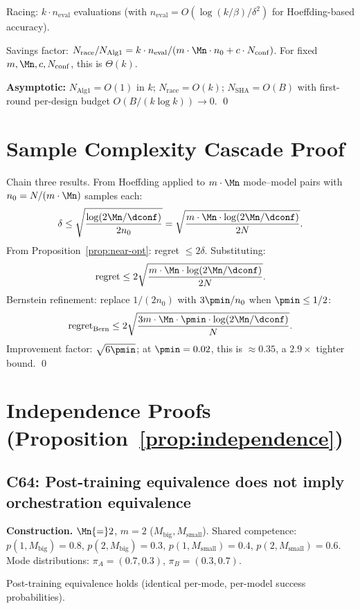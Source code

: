 Racing: $k \cdot n_{\mathrm{eval}}$ evaluations (with
$n_{\mathrm{eval}} = O(\log(k/\beta)/\delta^2)$ for Hoeffding-based
accuracy).

Savings factor:
$N_{\mathrm{race}}/N_{\mathrm{Alg1}} = k \cdot n_{\mathrm{eval}} /
(m \cdot \Mn \cdot n_0 + c \cdot N_{\mathrm{conf}})$.
For fixed $m, \Mn, c, N_{\mathrm{conf}}$, this is $\Theta(k)$.

\textbf{Asymptotic:}
$N_{\mathrm{Alg1}} = O(1)$ in $k$;
$N_{\mathrm{race}} = O(k)$;
$N_{\mathrm{SHA}} = O(B)$ with first-round per-design budget
$O(B/(k\log k)) \to 0$. \qed

\section{Sample Complexity Cascade Proof}
\label{app:cascade}

Chain three results.  From Hoeffding applied to $m \cdot \Mn$ mode--model
pairs with $n_0 = N/(m \cdot \Mn)$ samples each:
\[
  \delta \le \sqrt{\frac{\log(2\Mn/\dconf)}{2n_0}}
  = \sqrt{\frac{m \cdot \Mn \cdot \log(2\Mn/\dconf)}{2N}}.
\]
From Proposition~\ref{prop:near-opt}: regret $\le 2\delta$.
Substituting:
\[
  \text{regret} \le 2\sqrt{\frac{m \cdot \Mn \cdot \log(2\Mn/\dconf)}{2N}}.
\]
Bernstein refinement: replace $1/(2n_0)$ with
$3\pmin/n_0$ when $\pmin \le 1/2$:
\[
  \text{regret}_{\mathrm{Bern}} \le
  2\sqrt{\frac{3m \cdot \Mn \cdot \pmin \cdot \log(2\Mn/\dconf)}{N}}.
\]
Improvement factor: $\sqrt{6\pmin}$; at $\pmin = 0.02$, this is
$\approx 0.35$, a $2.9\times$ tighter bound. \qed

\section{Independence Proofs (Proposition~\ref{prop:independence})}
\label{app:independence}

\subsection{C64: Post-training equivalence does not imply orchestration equivalence}

\textbf{Construction.}
$\Mn{=}2$, $m{=}2$ ($M_{\mathrm{big}}, M_{\mathrm{small}}$).
Shared competence:
$p(1, M_{\mathrm{big}}) = 0.8$, $p(2, M_{\mathrm{big}}) = 0.3$,
$p(1, M_{\mathrm{small}}) = 0.4$, $p(2, M_{\mathrm{small}}) = 0.6$.
Mode distributions: $\pi_A = (0.7, 0.3)$, $\pi_B = (0.3, 0.7)$.

Post-training equivalence holds (identical per-mode, per-model success
probabilities).

